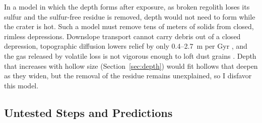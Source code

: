 \documentclass[article,review]{planetary}
\begin{document}
In a model in which the depth forms after exposure, as broken regolith loses its sulfur and the sulfur-free residue is removed, depth would not need to form while the crater is hot. Such a model must remove tens of meters of solids from closed, rimless depressions. Downslope transport cannot carry debris out of a closed depression, topographic diffusion lowers relief by only 0.4--2.7~m per Gyr \parencite{phillips2021}, and the gas released by volatile loss is not vigorous enough to loft dust grains \parencite{blewett2016}. Depth that increases with hollow size (Section~\ref{sec:depth}) would fit hollows that deepen as they widen, but the removal of the residue remains unexplained, so I disfavor this model.

\subsection{Untested Steps and Predictions}
\label{sec:predictions}
\end{document}
